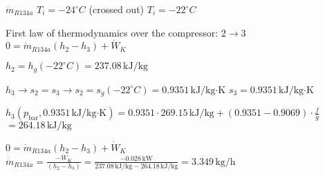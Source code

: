 \( \dot{m}_{R134a} \)  
\( T_i = -24^\circ C \) (crossed out)  
\( T_i = -22^\circ C \)  

First law of thermodynamics over the compressor: \( 2 \rightarrow 3 \)  
\( 0 = \dot{m}_{R134a} (h_2 - h_3) + \dot{W}_K \)  

\( h_2 = h_g(-22^\circ C) = 237.08 \, \text{kJ/kg} \)  

\( h_3 \rightarrow s_2 = s_3 \rightarrow s_2 = s_g(-22^\circ C) = 0.9351 \, \text{kJ/kg·K} \)  
\( s_3 = 0.9351 \, \text{kJ/kg·K} \)  

\( h_3(p_{\text{bar}}, 0.9351 \, \text{kJ/kg·K}) = 0.9351 \cdot 269.15 \, \text{kJ/kg} + (0.9351 - 0.9069) \cdot \frac{f}{g} \)  
\( = 264.18 \, \text{kJ/kg} \)  

\( 0 = \dot{m}_{R134a} (h_2 - h_3) + \dot{W}_K \)  
\( \dot{m}_{R134a} = \frac{-\dot{W}_K}{(h_2 - h_3)} = \frac{-0.028 \, \text{kW}}{237.08 \, \text{kJ/kg} - 264.18 \, \text{kJ/kg}} = 3.349 \, \text{kg/h} \)